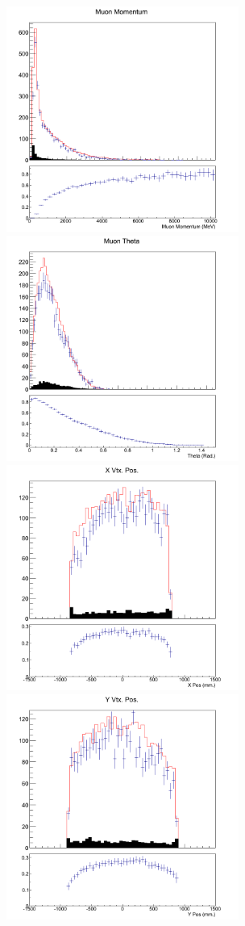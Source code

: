 \begin{figure}[h]
\centering
\includegraphics[width=3in]{Figures/TN100Plots/c_Pwater_1.png}
\includegraphics[width=3in]{Figures/TN100Plots/c_Thwater_1.png}
\includegraphics[width=3in]{Figures/TN100Plots/c_Xwater_1.png}
\includegraphics[width=3in]{Figures/TN100Plots/c_Ywater_1.png}

\end{figure}
